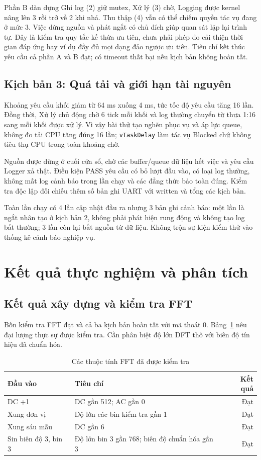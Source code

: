 \documentclass[12pt,a4paper,oneside]{report}
\begin{document}
Phần B dàn dựng Ghi log (2) giữ mutex, Xử lý (3) chờ, Logging được kernel nâng lên 3 rồi trở về 2 khi nhả. Thu thập (4) vẫn có thể chiếm quyền tác vụ đang ở mức 3. Việc dừng nguồn và phát ngắt có chủ đích giúp quan sát lặp lại trình tự. Đây là kiểm tra quy tắc kế thừa ưu tiên, chưa phải phép đo cải thiện thời gian đáp ứng hay ví dụ đầy đủ mọi dạng đảo ngược ưu tiên. Tiêu chí kết thúc yêu cầu cả phần A và B đạt; có timeout thất bại nếu kịch bản không hoàn tất.

\subsection{Kịch bản 3: Quá tải và giới hạn tài nguyên}
Khoảng yêu cầu khối giảm từ 64 ms xuống 4 ms, tức tốc độ yêu cầu tăng 16 lần. Đồng thời, Xử lý chủ động chờ 6 tick mỗi khối và log thường chuyển từ thưa 1:16 sang mỗi khối được xử lý. Vì vậy bài thử tạo nghẽn phục vụ và áp lực queue, không đo tải CPU tăng đúng 16 lần; \texttt{vTaskDelay} làm tác vụ Blocked chứ không tiêu thụ CPU trong toàn khoảng chờ.

Nguồn được dừng ở cuối cửa sổ, chờ các buffer/queue dữ liệu hết việc và yêu cầu Logger xả thật. Điều kiện PASS yêu cầu có bỏ lượt đầu vào, có loại log thường, không mất log cảnh báo trong lần chạy và các đẳng thức bảo toàn đúng. Kiểm tra độc lập đối chiếu thêm số bản ghi UART với written và tổng các kịch bản.

Toàn lần chạy có 4 lần cập nhật đầu ra nhưng 3 bản ghi cảnh báo: một lần là ngắt nhân tạo ở kịch bản 2, không phải phát hiện rung động và không tạo log bất thường; 3 lần còn lại bắt nguồn từ dữ liệu. Không trộn sự kiện kiểm thử vào thống kê cảnh báo nghiệp vụ.

\section{Kết quả thực nghiệm và phân tích}
\subsection{Kết quả xây dựng và kiểm tra FFT}
Bốn kiểm tra FFT đạt và cả ba kịch bản hoàn tất với mã thoát 0. Bảng~\ref{tab:ch4-golden} nêu đại lượng thực sự được kiểm tra. Cần phân biệt độ lớn DFT thô với biên độ tín hiệu đã chuẩn hóa.
\begin{table}[H]\centering\small
\caption{Các thuộc tính FFT đã được kiểm tra}\label{tab:ch4-golden}
\begin{tabularx}{\textwidth}{@{}p{3.5cm}Xr@{}}\toprule
Đầu vào & Tiêu chí & Kết quả \\\midrule
DC +1 & DC gần 512; AC gần 0 & Đạt \\
Xung đơn vị & Độ lớn các bin kiểm tra gần 1 & Đạt \\
Xung sáu mẫu & DC gần 6 & Đạt \\
Sin biên độ 3, bin 3 & Độ lớn bin 3 gần 768; biên độ chuẩn hóa gần 3 & Đạt \\
\bottomrule\end{tabularx}\end{table}
\end{document}
